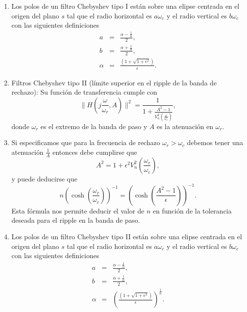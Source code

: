 \begin{enumerate}
        \item   Los polos de un filtro Chebyshev tipo I est\'{a}n sobre una elipse centrada en el origen
          del plano $s$ tal que el radio horizontal es $a \omega_{c}$ y el radio vertical es 
          $b \omega_{c}$ con las siguientes definiciones
                \begin{eqnarray}
                        a &=& \frac{\alpha - \frac{1}{\alpha}}{2},           \\
                        b &=& \frac{\alpha + \frac{1}{\alpha}}{2},           \\
                        \alpha &=& \frac{(1 + \sqrt{1+\epsilon^{2}})}{\epsilon}.
                \end{eqnarray}

        \item  Filtros Chebyshev tipo II (l\'{i}mite superior en el ripple de la banda de rechazo):
          Su funci\'{o}n de transferencia cumple con
          \begin{equation}
             \parallel H(j \frac{\omega}{\omega_{r}}, A) \parallel^{2} =
                   \frac{1}{1 + \frac{A^{2}-1}{V_{n}^{2}(\frac{\omega}{\omega_{c}})}},
          \end{equation}
          donde $\omega_{r}$ es el extremo de la banda de paso y $A$ es la atenuaci\'{o}n en $\omega_{r}$.

        \item   Si especificamos que para la frecuencia de rechazo $\omega_{r} > \omega_{c}$
          debemos tener una atenuaci\'{o}n $\frac{1}{A}$ entonces debe cumplirse que
          \begin{equation}
            A^{2} = 1 + \epsilon^{2} V_{n}^{2}(\frac{\omega_{r}}{\omega_{c}}),
          \end{equation}
          y puede deducirse que
          \begin{equation}
            n \left(\cosh\left(\frac{\omega_{r}}{\omega_{c}}\right)
              \right)^{-1} = 
              \left(\cosh\left(\frac{A^{2}-1}{\epsilon}\right)
              \right)^{-1}.
          \end{equation}
          Esta f\'{o}rmula nos permite deducir el valor de $n$ en funci\'{o}n de la tolerancia deseada
          para el ripple en la banda de paso.

        \item   Los polos de un filtro Chebyshev tipo II est\'{a}n sobre una elipse centrada en el origen
          del plano $s$ tal que el radio horizontal es $a \omega_{c}$ y el radio vertical es 
          $b \omega_{c}$ con las siguientes definiciones
                \begin{eqnarray}
                        a &=& \frac{\alpha - \frac{1}{\alpha}}{2},           \\
                        b &=& \frac{\alpha + \frac{1}{\alpha}}{2},           \\
                        \alpha &=& 
                        \left(\frac{(1 + \sqrt{1+\epsilon^{2}})}{\epsilon}\right)^{\frac{1}{n}}.
                \end{eqnarray}

\end{enumerate}

